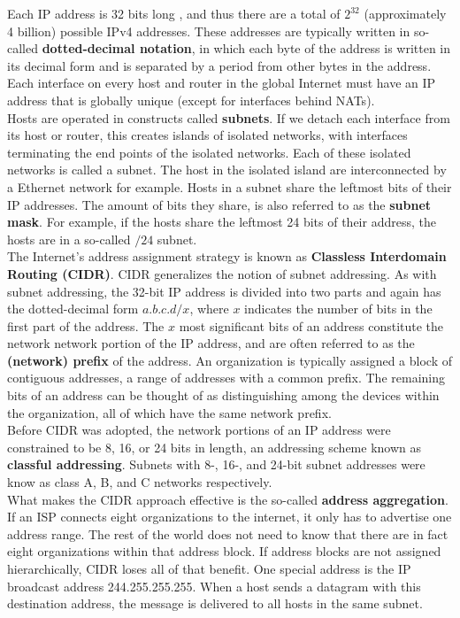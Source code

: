 Each IP address is 32 bits long , and thus there are a total of $2^{32}$ (approximately 4 billion) possible IPv4 addresses. These addresses are typically written in so-called \textbf{dotted-decimal notation}, in which each byte of the address is written in its decimal form and is separated by a period from other bytes in the address. Each interface on every host and router in the global Internet must have an IP address that is globally unique (except for interfaces behind NATs). \\
Hosts are operated in constructs called \textbf{subnets}. If we detach each interface from its host or router, this creates islands of isolated networks, with interfaces terminating the end points of the isolated networks. Each of these isolated networks is called a subnet. The host in the isolated island are interconnected by a Ethernet network for example. Hosts in a subnet share the leftmost bits of their IP addresses. The amount of bits they share, is also referred to as the \textbf{subnet mask}. For example, if the hosts share the leftmost 24 bits of their address, the hosts are in a so-called $/24$ subnet.\vspace{.3cm}\\

The Internet's address assignment strategy is known as \textbf{Classless Interdomain Routing (CIDR)}. CIDR generalizes the notion of subnet addressing. As with subnet addressing, the 32-bit IP address is divided into two parts and again has the dotted-decimal form $a.b.c.d/x$, where $x$ indicates the number of bits in the first part of the address. The $x$ most significant bits of an address constitute the network network portion of the IP address, and are often referred to as the \textbf{(network) prefix} of the address. An organization is typically assigned a block of contiguous addresses, a range of addresses with a common prefix. The remaining bits of an address can be thought of as distinguishing among the devices within the organization, all of which have the same network prefix.\\
Before CIDR was adopted, the network portions of an IP address were constrained to be 8, 16, or 24 bits in length, an addressing scheme known as \textbf{classful addressing}. Subnets with 8-, 16-, and 24-bit subnet addresses were know as class A, B, and C networks respectively. \\
What makes the CIDR approach effective is the so-called \textbf{address aggregation}. If an ISP connects eight organizations to the internet, it only has to advertise one address range. The rest of the world does not need to know that there are in fact eight organizations within that address block. If address blocks are not assigned hierarchically, CIDR loses all of that benefit. One special address is the IP broadcast address 244.255.255.255. When a host sends a datagram with this destination address, the message is delivered to all hosts in the same subnet.\vspace{.3cm}\\

